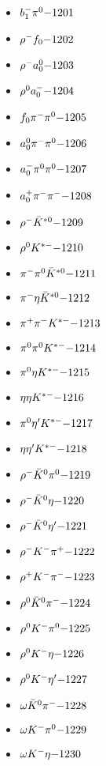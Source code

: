 \begin{multicols}{3}
\begin{itemize}
 \item $ b_{1}^{-} \pi^{0} \hfill{-1201}$
 \item $ \rho^{-} f_{0} \hfill{-1202}$
 \item $ \rho^{-} a_{0}^{0} \hfill{-1203}$
 \item $ \rho^{0} a_{0}^{-} \hfill{-1204}$
 \item $ f_{0} \pi^{-} \pi^{0} \hfill{-1205}$
 \item $ a_{0}^{0} \pi^{-} \pi^{0} \hfill{-1206}$
 \item $ a_{0}^{-} \pi^{0} \pi^{0} \hfill{-1207}$
 \item $ a_{0}^{+} \pi^{-} \pi^{-} \hfill{-1208}$
 \item $ \rho^{-} \bar{K}^{*0} \hfill{-1209}$
 \item $ \rho^{0} K^{*-} \hfill{-1210}$
 \item $ \pi^{-} \pi^{0} \bar{K}^{*0} \hfill{-1211}$
 \item $ \pi^{-} \eta \bar{K}^{*0} \hfill{-1212}$
 \item $ \pi^{+} \pi^{-} K^{*-} \hfill{-1213}$
 \item $ \pi^{0} \pi^{0} K^{*-} \hfill{-1214}$
 \item $ \pi^{0} \eta K^{*-} \hfill{-1215}$
 \item $ \eta \eta K^{*-} \hfill{-1216}$
 \item $ \pi^{0} {\eta^{\prime}} K^{*-} \hfill{-1217}$
 \item $ \eta {\eta^{\prime}} K^{*-} \hfill{-1218}$
 \item $ \rho^{-} \bar{K}^{0} \pi^{0} \hfill{-1219}$
 \item $ \rho^{-} \bar{K}^{0} \eta \hfill{-1220}$
 \item $ \rho^{-} \bar{K}^{0} {\eta^{\prime}} \hfill{-1221}$
 \item $ \rho^{-} K^{-} \pi^{+} \hfill{-1222}$
 \item $ \rho^{+} K^{-} \pi^{-} \hfill{-1223}$
 \item $ \rho^{0} \bar{K}^{0} \pi^{-} \hfill{-1224}$
 \item $ \rho^{0} K^{-} \pi^{0} \hfill{-1225}$
 \item $ \rho^{0} K^{-} \eta \hfill{-1226}$
 \item $ \rho^{0} K^{-} {\eta^{\prime}} \hfill{-1227}$
 \item $ \omega \bar{K}^{0} \pi^{-} \hfill{-1228}$
 \item $ \omega K^{-} \pi^{0} \hfill{-1229}$
 \item $ \omega K^{-} \eta \hfill{-1230}$

\end{itemize}
\end{multicols}
